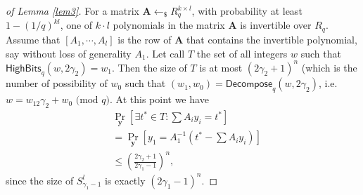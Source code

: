 \documentclass[conference]{IEEEtran}
\newtheorem{proof}{Proof}
\begin{document}
	
	\begin{proof}[of Lemma \ref{lem3}]
		
		For a matrix $\mathbf{A} \leftarrow_{\$} R_q^{k \times l}$, with probability at least $1-(1/q)^{kl}$, one of $k\cdot l$ polynomials in the matrix $\mathbf{A}$ is invertible over $R_q$. 
		Assume that $[A_1,\cdots, A_l]$ is the row of $\mathbf{A}$ that contains the invertible polynomial, say without loss of generality $A_1$. Let call $T$ the set of all integers $w$ such that  $\mathsf{HighBits}_q(w, 2\gamma_2)=w_1$. Then the size of $T$ is at most $(2\gamma_2+1)^n$ (which is the number of possibility of $w_0$ such that $(w_1,w_0)=\textsf{Decompose}_q(w,2\gamma_2)$, i.e. $w=w_12\gamma_2+w_0 \text{ (mod } q)$.
		At this point we have 
		\begin{equation*}
		\begin{split}
		&\Pr_{\mathbf{y}}\left[\exists t^*\in T: \sum A_iy_i =t^*\right] \\&=	\Pr_{\mathbf{y}}[y_1 = A_1^{-1}(t^*-\sum A_iy_i )] \\&\leq \left(\frac{2\gamma_2+1}{2\gamma_1-1}\right)^n,
		\end{split}
		\end{equation*}
		since the size of $S_{\gamma_1-1}^l$ is exactly $(2\gamma_1-1)^n$.
	\end{proof}
	
	
\end{document}
